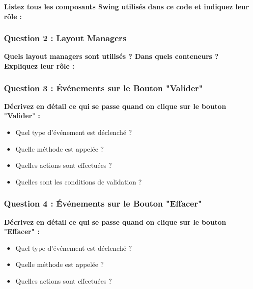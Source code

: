 \documentclass[11pt,a4paper]{article}
\begin{document}
\textbf{Listez tous les composants Swing utilisés dans ce code et indiquez leur rôle :}

\begin{reponsebox}
\vspace{6cm}
\end{reponsebox}

\subsubsection{Question 2 : Layout Managers}

\textbf{Quels layout managers sont utilisés ? Dans quels conteneurs ? Expliquez leur rôle :}

\begin{reponsebox}
\vspace{5cm}
\end{reponsebox}

\subsubsection{Question 3 : Événements sur le Bouton "Valider"}

\textbf{Décrivez en détail ce qui se passe quand on clique sur le bouton "Valider" :}
\begin{itemize}
    \item Quel type d'événement est déclenché ?
    \item Quelle méthode est appelée ?
    \item Quelles actions sont effectuées ?
    \item Quelles sont les conditions de validation ?
\end{itemize}

\begin{reponsebox}
\vspace{8cm}
\end{reponsebox}

\subsubsection{Question 4 : Événements sur le Bouton "Effacer"}

\textbf{Décrivez en détail ce qui se passe quand on clique sur le bouton "Effacer" :}
\begin{itemize}
    \item Quel type d'événement est déclenché ?
    \item Quelle méthode est appelée ?
    \item Quelles actions sont effectuées ?
\end{itemize}
\end{document}
